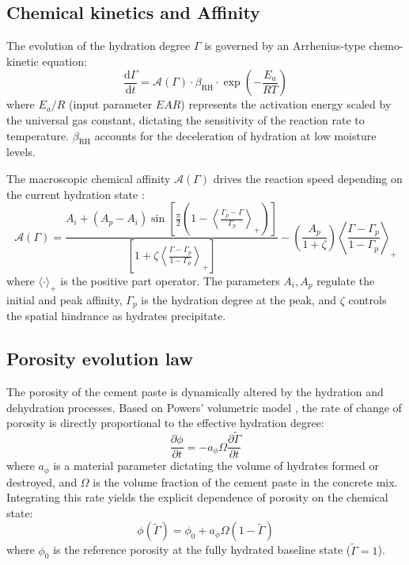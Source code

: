 \subsection{Chemical kinetics and Affinity} \label{sec:affinity}
The evolution of the hydration degree $\Gamma$ is governed by an Arrhenius-type chemo-kinetic equation:
\begin{equation}
    \frac{\mathrm{d}\Gamma}{\mathrm{d}t} = \mathcal{A}(\Gamma) \cdot \beta_{\mathrm{RH}} \cdot \exp\left( -\frac{E_a}{R T} \right)
\end{equation}
where $E_a/R$ (input parameter $EAR$) represents the activation energy scaled by the universal gas constant, dictating the sensitivity of the reaction rate to temperature. $\beta_{\mathrm{RH}}$ accounts for the deceleration of hydration at low moisture levels. 

The macroscopic chemical affinity $\mathcal{A}(\Gamma)$ drives the reaction speed depending on the current hydration state \cite{sciume2024}:
\begin{equation}
    \mathcal{A}(\Gamma) = \frac{A_i + (A_p - A_i)\sin\left[\frac{\pi}{2}\left(1 - \left\langle \frac{\Gamma_p - \Gamma}{\Gamma_p} \right\rangle_+\right)\right]}{\left[1 + \zeta \left\langle \frac{\Gamma - \Gamma_p}{1 - \Gamma_p} \right\rangle_+\right]} - \left(\frac{A_p}{1+\zeta}\right)\left\langle \frac{\Gamma - \Gamma_p}{1 - \Gamma_p} \right\rangle_+
\end{equation}
where $\langle \cdot \rangle_+$ is the positive part operator. The parameters $A_i, A_p$ regulate the initial and peak affinity, $\Gamma_p$ is the hydration degree at the peak, and $\zeta$ controls the spatial hindrance as hydrates precipitate.

\subsection{Porosity evolution law} \label{sec:porosity-law}
The porosity of the cement paste is dynamically altered by the hydration and dehydration processes. Based on Powers' volumetric model \cite{sciume2024}, the rate of change of porosity is directly proportional to the effective hydration degree:
\begin{equation}
    \frac{\partial \phi}{\partial t} = -a_\phi \Omega \frac{\partial \tilde{\Gamma}}{\partial t}
\end{equation}
where $a_\phi$ is a material parameter dictating the volume of hydrates formed or destroyed, and $\Omega$ is the volume fraction of the cement paste in the concrete mix. Integrating this rate yields the explicit dependence of porosity on the chemical state:
\begin{equation}
    \phi(\tilde{\Gamma}) = \phi_0 + a_\phi \Omega (1 - \tilde{\Gamma})
\end{equation}
where $\phi_0$ is the reference porosity at the fully hydrated baseline state ($\tilde{\Gamma} = 1$). 

